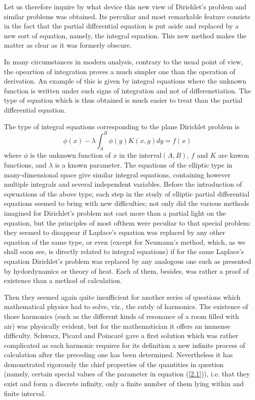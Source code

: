 \documentclass[12pt,oneside]{book}
\begin{document}
Let us therefore inquire by what device this new view of Dirichlet's problem and similar problems was obtained. Its perculiar and most remarkable feature consists in the fact that the partial differential equation is put aside and replaced by a new sort of equation, namely, the integral equation. This new method makes the matter as clear as it was formerly obscure. \par 

In many circumstances in modern analysis, contrary to the usual point of view, the opeartion of integration proves a much simpler one than the operation of derivation. An example of this is given by integral equations where the unknown function is written under such signs of integration and not of differenetiation. The type of equation which is thus obtained is much easier to treat than the partial differential equation. \par 

The type of integral equations corresponding to the plane Dirichlet problem is 
\begin{equation}
    \label{2.1}
    \phi(x)-\lambda\int_A^B\phi(y)K(x,y)dy=f(x)
\end{equation}
where $\phi$ is the unknown function of $x$ in the interval$(A,B)$, $f$ and $K$ are knwon functions, and $\lambda$ is a known parameter. The equations of the elliptic type in many-dimensional space give similar integral equations, containing however multiple integrals and several independent variables. Before the introduction of eqwuations of the above type, each step in the study of elliptic partial differential equations seemed to bring with new difficulties; not only did the various methods imagined for Dirichlet's problem not cast more than a partial light on the equation, but the principles of most ofthem were peculiar to that special problem: they seemed to disappear if Laplace's equation was replaced by any other equation of the same type, or even (except for Neumann's method, which, as we shall soon see, is directly related to integral equations) if for the same Laplace's equation Dirichlet's problem was replaced by any analogous one such as presented by hydordynamics or theory of heat. Each of them, besides, was rather a proof of existence than a method of calculation. \par 

Then they seemed again quite insufficient for another series of questions which mathematical physics had to solve, viz., the sutdy of harmonics. The existence of those harmonics (such as the different kinds of resonance of a room filled with air) was physically evident, but for the mathematician it offers an immense difficulty. Schwarz, Picard and Poincar\'e gave a first solution which was rather complicated as each harmonic requires for its definition a new infinite process of calculation after the preceding one has been determined. Nevertheless it has demonstrated rigorously the chief properties of the quantities in question (namely, certain special values of the parameter in equation (\ref{2.1})), i.e. that they exist and form a discrete infinity, only a finite number of them lying within and finite interval. \par 
\end{document}
